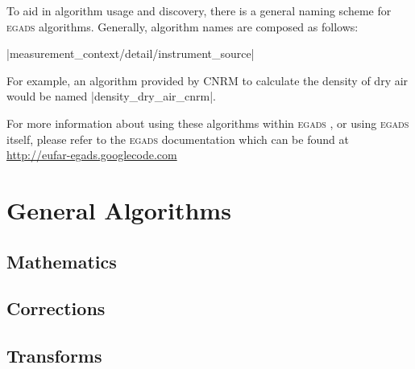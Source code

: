 \documentclass[a4paper,11pt]{report}
\newcommand{\egads}{\textsc{egads} }
\begin{document}
To aid in algorithm usage and discovery, there is a general naming scheme for \egads algorithms. Generally, algorithm names are composed as follows: 


|{measurement}_{context/detail/instrument}_{source}| 


For example, an algorithm provided by CNRM to calculate the density of dry air would be named |density_dry_air_cnrm|.

For more information about using these algorithms within \egads, or using \egads itself, please refer
to the \egads documentation which can be found at \href{http://eufar-egads.googlecode.com}
{http://eufar-egads.googlecode.com}



\part{General Algorithms}

\chapter{Mathematics}



\chapter{Corrections}



\chapter{Transforms}








\end{document}
